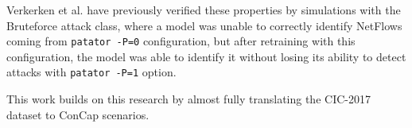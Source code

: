 Verkerken et al. have previously verified these properties by simulations with the Bruteforce attack class, where a model was unable to correctly identify NetFlows coming from \texttt{patator -P=0} configuration, but after retraining with this configuration, the model was able to identify it without losing its ability to detect attacks with \texttt{patator -P=1} option.

This work builds on this research by almost fully translating the CIC-2017 dataset to ConCap scenarios.